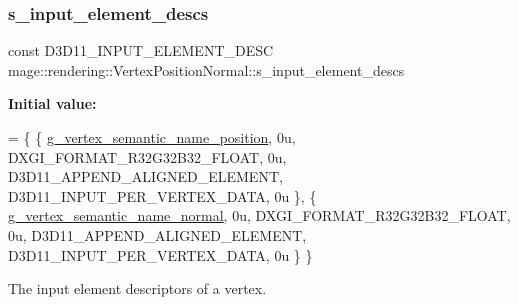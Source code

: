 \subsubsection{\texorpdfstring{s\+\_\+input\+\_\+element\+\_\+descs}{s\_input\_element\_descs}}
{\footnotesize\ttfamily const D3\+D11\+\_\+\+I\+N\+P\+U\+T\+\_\+\+E\+L\+E\+M\+E\+N\+T\+\_\+\+D\+E\+SC mage\+::rendering\+::\+Vertex\+Position\+Normal\+::s\+\_\+input\+\_\+element\+\_\+descs\hspace{0.3cm}{\ttfamily [static]}}

{\bfseries Initial value\+:}
\begin{DoxyCode}
= \{
        \{ \hyperlink{namespacemage_1_1rendering_ae0a999915bd61d5a9d8addc04fe0646a}{g\_vertex\_semantic\_name\_position}, 0u, DXGI\_FORMAT\_R32G32B32\_FLOAT, 
         0u, D3D11\_APPEND\_ALIGNED\_ELEMENT, D3D11\_INPUT\_PER\_VERTEX\_DATA, 0u \},
        \{ \hyperlink{namespacemage_1_1rendering_aef3f964c7435c0b2009c7c5390ee3234}{g\_vertex\_semantic\_name\_normal},   0u, DXGI\_FORMAT\_R32G32B32\_FLOAT,   
       0u, D3D11\_APPEND\_ALIGNED\_ELEMENT, D3D11\_INPUT\_PER\_VERTEX\_DATA, 0u \}
    \}
\end{DoxyCode}
The input element descriptors of a vertex. 